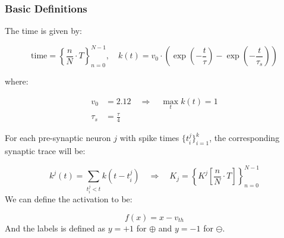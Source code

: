 \subsubsection{Basic Definitions}

The time is given by:

\begin{equation} \label{eq:cuba-model}
    \text{time} = \left\{\frac{n}{N} \cdot T\right\}_{n=0}^{N-1}, \quad k(t) = v_0 \cdot \left(\exp\left(-\frac{t}{\tau}\right) - \exp\left(-\frac{t}{\tau_s}\right)\right)
\end{equation}

where:

\begin{align*}
    v_0 &= 2.12 \quad \Rightarrow \quad \max_t k(t) = 1 \\
    \tau_s &= \frac{\tau}{4}
\end{align*}

For each pre-synaptic neuron $j$ with spike times $\{t_i^j\}_{i=1}^k$, the corresponding synaptic trace will be:

\begin{equation}
    k^j(t) = \sum_{t_i^j < t} k(t - t_i^j) \quad \Rightarrow \quad K_j = \left\{K^j\left[\frac{n}{N} \cdot T\right]\right\}_{n=0}^{N-1}
\end{equation}
We can define the activation to be:

\begin{equation}
    f(x) = x - v_{th}
\end{equation}
And the labels is defined as $y = +1$ for $\oplus$ and $y=-1$ for $\ominus$.